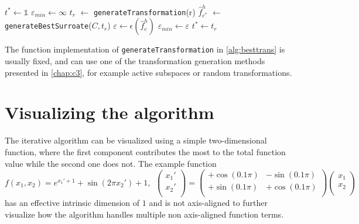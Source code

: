 \documentclass[
  a4paper,  %
  twoside,  %
  bibliography=totoc,
  headsepline,
  cleardoublepage=empty,
  parskip=half,
  draft=false
]{scrbook}
\begin{document}
\begin{mdframed}[style=algstyle,frametitle={\textbf{function} \texttt{generateBestTransformation}{$(r_{\text{min}} ,r_{\text{max}})$}}]
\normalsize
\vspace{5.5mm}
\begin{algorithmic}[1]
    \State $t^\ast \gets \mathds{1}$
    \State $\varepsilon_{min} \gets \infty$
      \State $t_r$ $\gets$ \texttt{generateTransformation}(r)
      \State $\hat{f}_{c^\ast}^h$ $\gets$ \texttt{generateBestSurroate}($C, t_r$)
    	\State $\varepsilon \gets \epsilon(\hat{f}_c^h)$
    	  \State $\varepsilon_{min}\gets \varepsilon$
    	\State $t^\ast \gets t_r$
    	\EndIf
    \EndFor
    \State {}
\end{algorithmic}
\vspace{-1.5mm}
\delimit
	\label{alg:besttrans}
\end{mdframed}

The function implementation of \texttt{generateTransformation} in \cref{alg:besttrans} is usually fixed, and can use one of the transformation generation methods presented in \cref{chap:c3}, for example active subspaces or random transformations.

\section{Visualizing the algorithm}

The iterative algorithm can be visualized using a simple two-dimensional function, where the first component contributes the most to the total function value while the second one does not.
The example function
\begin{equation}
f(x_1, x_2)=e^{x_1' + 1} + \sin(2 \pi x_2') + 1, ~~ \begin{pmatrix}
    x_1' \\ x_2'
    \\
  \end{pmatrix} = \begin{pmatrix}
    +\cos(0.1 \pi) & -\sin(0.1 \pi)\\
    +\sin(0.1 \pi) & +\cos(0.1 \pi)
    \\
  \end{pmatrix}\begin{pmatrix}
    x_1 \\ x_2
    \\
  \end{pmatrix}
\end{equation}
has an effective intrinsic dimension of $1$ and is not axis-aligned to further visualize how the algorithm handles multiple non axis-aligned function terms.
\end{document}
